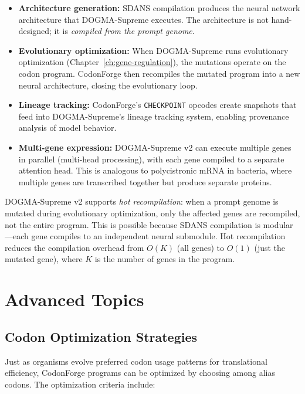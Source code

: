 \begin{itemize}[leftmargin=1.8em]
  \item \textbf{Architecture generation:} SDANS compilation produces the neural network architecture that DOGMA-Supreme executes. The architecture is not hand-designed; it is \emph{compiled from the prompt genome}.
  \item \textbf{Evolutionary optimization:} When DOGMA-Supreme runs evolutionary optimization (Chapter~\ref{ch:gene-regulation}), the mutations operate on the codon program. CodonForge then recompiles the mutated program into a new neural architecture, closing the evolutionary loop.
  \item \textbf{Lineage tracking:} CodonForge's \texttt{CHECKPOINT} opcodes create snapshots that feed into DOGMA-Supreme's lineage tracking system, enabling provenance analysis of model behavior.
  \item \textbf{Multi-gene expression:} DOGMA-Supreme v2 can execute multiple genes in parallel (multi-head processing), with each gene compiled to a separate attention head. This is analogous to polycistronic mRNA in bacteria, where multiple genes are transcribed together but produce separate proteins.
\end{itemize}

\begin{implnote}
DOGMA-Supreme v2 supports \emph{hot recompilation}: when a prompt genome is mutated during evolutionary optimization, only the affected genes are recompiled, not the entire program. This is possible because SDANS compilation is modular---each gene compiles to an independent neural submodule. Hot recompilation reduces the compilation overhead from $O(K)$ (all genes) to $O(1)$ (just the mutated gene), where $K$ is the number of genes in the program.
\end{implnote}


\section{Advanced Topics}
\label{sec:advanced-topics}

\subsection{Codon Optimization Strategies}

Just as organisms evolve preferred codon usage patterns for translational efficiency, CodonForge programs can be optimized by choosing among alias codons. The optimization criteria include:

